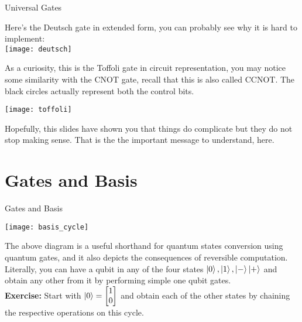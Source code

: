 \documentclass[aspectratio=43]{beamer}
\begin{document}
\begin{frame}{\q Universal Gates}
\begin{cardTiny}
    \small{Here's the Deutsch gate in extended form, you can probably see why it is hard to implement:}\\
    \texttt{[image: deutsch]}
\end{cardTiny}
\begin{cardTiny}
    \begin{multicols}{2}
    \small{As a curiosity, this is the Toffoli gate in circuit representation, you may notice some similarity with the CNOT gate, recall that this is also called CCNOT. The black circles actually represent both the control bits.}
    \begin{center}
        \texttt{[image: toffoli]} 
    \end{center}
    \end{multicols}
\end{cardTiny}
\begin{cardTiny}
    \small{Hopefully, this slides have shown you that things do complicate but they do not stop making sense. That is the the important message to understand, here.}
\end{cardTiny}
\pagenumber
\end{frame}



\section{Gates and Basis}
\begin{frame}{Gates and Basis}
    \begin{center}
        \texttt{[image: basis\_cycle]} 
    \end{center}
    \begin{cardTiny}
        \small{The above diagram is a useful shorthand for quantum states conversion using quantum gates, and it also depicts the consequences of reversible computation. Literally, you can have a qubit in any of the four states $\ket{0},\ket{1},\ket{-}\ket{+}$ and obtain any other from it by performing simple one qubit gates.\\
        \textbf{Exercise:} Start with $\ket{0} = \begin{bmatrix}1 \\ 0\end{bmatrix}$ and obtain each of the other states by chaining the respective operations on this cycle.}
    \end{cardTiny}
\pagenumber
\end{frame}
\end{document}
